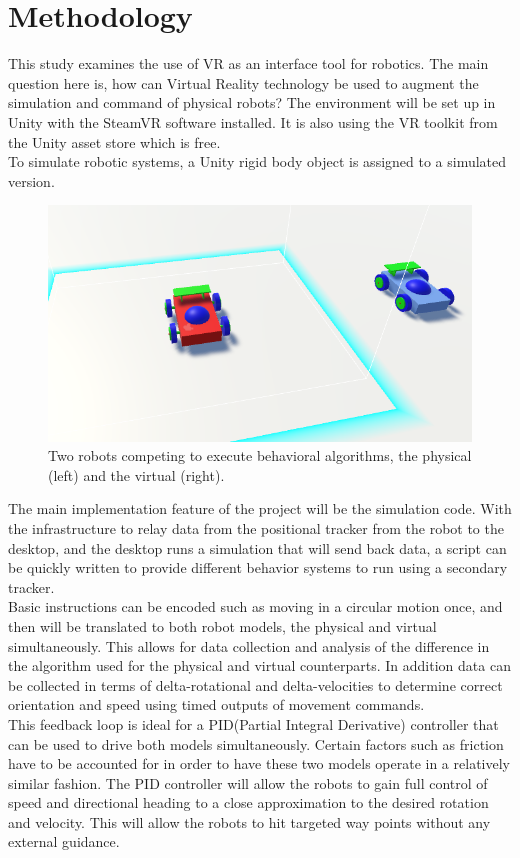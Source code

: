 \documentclass[10pt,a4paper]{article}
\begin{document}
	\section{Methodology}
	This study examines the use of VR as an interface tool for robotics. The main question here is, how can Virtual Reality technology be used to augment the simulation and command of physical robots? The environment will be set up in Unity with the SteamVR software installed. It is also using the VR toolkit from the Unity asset store which is free.
	\\
	To simulate robotic systems, a Unity rigid body object is assigned to a simulated version. 		\begin{figure}[h]
		\centering
		\includegraphics[width=.4\textwidth]{robot-rivalry.png}
		\caption{Two robots competing to execute behavioral algorithms, the physical (left) and the virtual (right).}
		\label{fig:robot-rivalry}
	\end{figure}
	The main implementation feature of the project will be the simulation code. With the infrastructure to relay data from the positional tracker from the robot to the desktop, and the desktop runs a simulation that will send back data, a script can be quickly written to provide different behavior systems to run using a secondary tracker.
	\\
	Basic instructions can be encoded such as moving in a circular motion once, and then will be translated to both robot models, the physical and virtual simultaneously. This allows for data collection and analysis of the difference in the algorithm used for the physical and virtual counterparts. In addition data can be collected in terms of delta-rotational and delta-velocities to determine correct orientation and speed using timed outputs of movement commands.
	\\
	This feedback loop is ideal for a PID(Partial Integral Derivative) controller that can be used to drive both models simultaneously. Certain factors such as friction have to be accounted for in order to have these two models operate in a relatively similar fashion. The PID controller will allow the robots to gain full control of speed and directional heading to a close approximation to the desired rotation and velocity. This will allow the robots to hit targeted way points without any external guidance.
\end{document}
